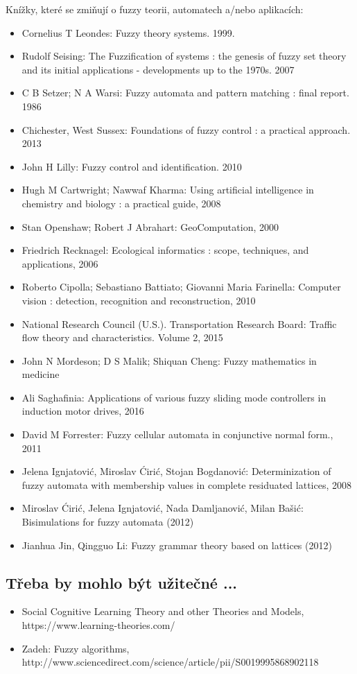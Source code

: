 \documentclass[a4paper,10pt]{article}
\begin{document}
Knížky, které se zmiňují o fuzzy teorii, automatech a/nebo aplikacích:
\begin{itemize}
 \item Cornelius T Leondes: Fuzzy theory systems. 1999.  
 \item Rudolf Seising: The Fuzzification of systems : the genesis of fuzzy set theory and its initial applications - developments up to the 1970s. 2007
 \item C B Setzer; N A Warsi: Fuzzy automata and pattern matching : final report. 1986
 \item Chichester, West Sussex: Foundations of fuzzy control : a practical approach. 2013
 \item John H Lilly: Fuzzy control and identification. 2010
 \item Hugh M Cartwright; Nawwaf Kharma: Using artificial intelligence in chemistry and biology : a practical guide, 2008
 \item Stan Openshaw; Robert J Abrahart: GeoComputation, 2000
 \item Friedrich Recknagel: Ecological informatics : scope, techniques, and applications, 2006
 \item Roberto Cipolla; Sebastiano Battiato; Giovanni Maria Farinella: Computer vision : detection, recognition and reconstruction, 2010

 \item National Research Council (U.S.). Transportation Research Board: Traffic flow theory and characteristics. Volume 2, 2015
 \item John N Mordeson; D S Malik; Shiquan Cheng: Fuzzy mathematics in medicine
 \item Ali Saghafinia: Applications of various fuzzy sliding mode controllers in induction motor drives, 2016
 \item David M Forrester: Fuzzy cellular automata in conjunctive normal form., 2011
 \item Jelena Ignjatović, Miroslav Ćirić, Stojan Bogdanović: Determinization of fuzzy automata with membership values in complete residuated lattices, 2008
 \item Miroslav Ćirić, Jelena Ignjatović, Nada Damljanović, Milan Bašić: Bisimulations for fuzzy automata (2012)
 \item Jianhua Jin, Qingguo Li: Fuzzy grammar theory based on lattices (2012)
\end{itemize}

\subsection{Třeba by mohlo být užitečné ...}
\begin{itemize}
 \item Social Cognitive Learning Theory and other Theories and Models, https://www.learning-theories.com/
 \item Zadeh: Fuzzy algorithms, http://www.sciencedirect.com/science/article/pii/S0019995868902118
\end{itemize}

\newpage


\end{document}
